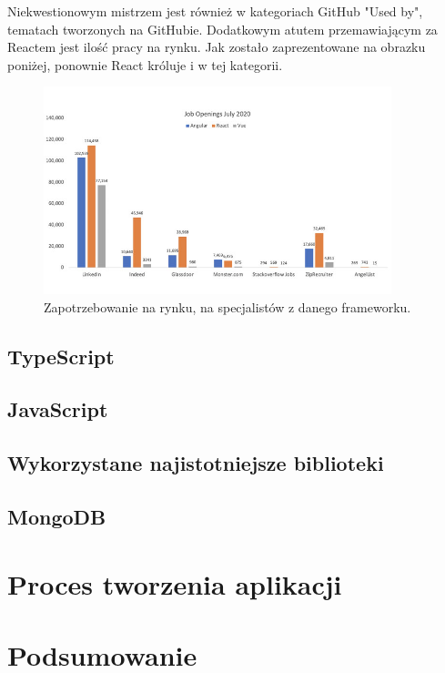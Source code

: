 \documentclass[12pt]{article}
\begin{document}
\begin{sloppypar}
{{  Niekwestionowym mistrzem jest również w kategoriach GitHub "Used by", tematach tworzonych na GitHubie.\cite{frontend-popularity} Dodatkowym atutem przemawiającym za Reactem jest 
  ilość pracy na rynku. Jak zostało zaprezentowane na obrazku poniżej, ponownie React króluje i w tej kategorii. 
  \begin{figure}[H]
    \centering
    \includegraphics[width=0.9\textwidth]{frontend_jobs.jpg}
    \caption{Zapotrzebowanie na rynku, na specjalistów z danego frameworku.\cite{accenture}}
    \label{fig:frontend-jobs}
  \end{figure}
}
\subsection{TypeScript}
{

}
\subsection{JavaScript}
{

}
\subsection{Wykorzystane najistotniejsze biblioteki}
{

}
\subsection{MongoDB}
{

}
}

\section{Proces tworzenia aplikacji}
{

}

\section{Podsumowanie}
{

}
\end{sloppypar}
\end{document}
